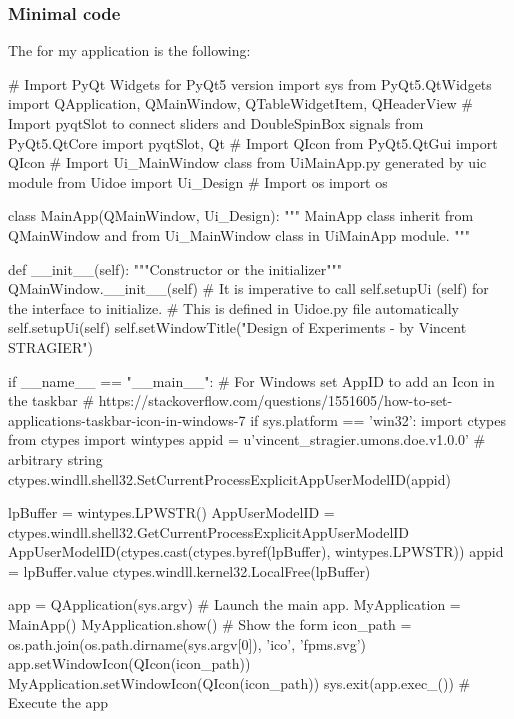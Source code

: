 \documentclass[english, 12 pt, openany, oneside]{book}
\begin{document}
\subsubsection{Minimal code}
The  for my application is the following:
\begin{pyverbatim}[][breaklines]
# Import PyQt Widgets for PyQt5 version
import sys
from PyQt5.QtWidgets import QApplication, QMainWindow, QTableWidgetItem, QHeaderView
# Import pyqtSlot to connect sliders and DoubleSpinBox signals
from PyQt5.QtCore import pyqtSlot, Qt
# Import QIcon
from PyQt5.QtGui import QIcon
# Import Ui_MainWindow class from UiMainApp.py generated by uic module
from Uidoe import Ui_Design
# Import os
import os

class MainApp(QMainWindow, Ui_Design):
    """
    MainApp class inherit from QMainWindow and from
    Ui_MainWindow class in UiMainApp module.
    """

    def __init__(self):
        """Constructor or the initializer"""
        QMainWindow.__init__(self)
        # It is imperative to call self.setupUi (self) for the interface to initialize.
        # This is defined in Uidoe.py file automatically
        self.setupUi(self)
        self.setWindowTitle("Design of Experiments - by Vincent STRAGIER")
        

if __name__ == "__main__":
    # For Windows set AppID to add an Icon in the taskbar
    # https://stackoverflow.com/questions/1551605/how-to-set-applications-taskbar-icon-in-windows-7
    if sys.platform == 'win32':
        import ctypes
        from ctypes import wintypes
        appid = u'vincent_stragier.umons.doe.v1.0.0'  # arbitrary string
        ctypes.windll.shell32.SetCurrentProcessExplicitAppUserModelID(appid)

        lpBuffer = wintypes.LPWSTR()
        AppUserModelID = ctypes.windll.shell32.GetCurrentProcessExplicitAppUserModelID
        AppUserModelID(ctypes.cast(ctypes.byref(lpBuffer), wintypes.LPWSTR))
        appid = lpBuffer.value
        ctypes.windll.kernel32.LocalFree(lpBuffer)
    
    app = QApplication(sys.argv)
    # Launch the main app.
    MyApplication = MainApp()
    MyApplication.show()  # Show the form
    icon_path = os.path.join(os.path.dirname(sys.argv[0]), 'ico', 'fpms.svg')
    app.setWindowIcon(QIcon(icon_path))
    MyApplication.setWindowIcon(QIcon(icon_path))
    sys.exit(app.exec_())  # Execute the app
\end{pyverbatim}
\end{document}
